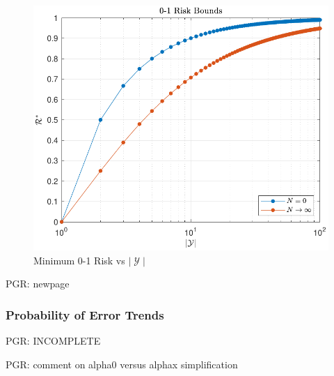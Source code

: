 \documentclass[12pt]{report}
\DeclareMathOperator{\Ycal}{\mathcal{Y}}
\begin{document}
\begin{figure}
\centering
\includegraphics[width=0.7\linewidth]{Risk_01_uni_N_bounds.pdf}
\caption{Minimum 0-1 Risk vs $|\Ycal|$}
\label{fig:Risk_01_uni_N_bounds}
\end{figure}




\newpage
PGR: newpage

\subsubsection{Probability of Error Trends}

PGR: INCOMPLETE

PGR: comment on alpha0 versus alphax simplification
\end{document}
